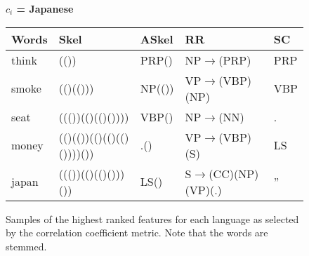 \begin{figure*}[ht]
\begin{center}
    \vspace{.1in}
    
    \textbf{$c_i$ = Japanese} \\
    \begin{tabular}{|l|l|l|l|l|}
        \hline
        \textbf{Words} & \textbf{Skel} & \textbf{ASkel} & \textbf{RR }& \textbf{SC }\\
        \hline
        think & (())                      &  PRP() &  NP$\rightarrow$(PRP)         &  PRP\\
        smoke &  (()(()))                 &  NP(())&  VP$\rightarrow$(VBP)(NP)     &  VBP\\
        seat &  ((())(()(()())))          &  VBP() &  NP$\rightarrow$(NN)          &  .  \\
        money &  (()(())(()(()(()())))()) &  .()   &  VP$\rightarrow$(VBP)(S)      &  LS \\
        japan &  ((())(()(()()))())       &  LS()  &  S$\rightarrow$(CC)(NP)(VP)(.)&  '' \\
        \hline
    \end{tabular}

    \caption{{\normalsize Samples of the highest ranked features for each language as selected
    by the correlation coefficient metric. Note that the words are stemmed.}}

\label{fig:validity}
\end{center}

\end{figure*}
